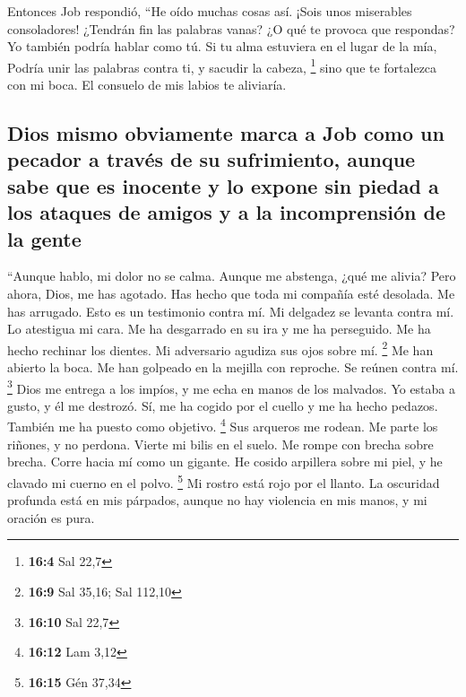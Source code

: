  Entonces Job respondió,  ``He oído muchas
cosas así. ¡Sois unos miserables consoladores!  ¿Tendrán
fin las palabras vanas? ¿O qué te provoca que respondas? 
Yo también podría hablar como tú. Si tu alma estuviera en el lugar de la
mía, Podría unir las palabras contra ti, y sacudir la cabeza,
\footnote{\textbf{16:4} Sal 22,7}  sino que te fortalezca
con mi boca. El consuelo de mis labios te aliviaría.

\hypertarget{dios-mismo-obviamente-marca-a-job-como-un-pecador-a-travuxe9s-de-su-sufrimiento-aunque-sabe-que-es-inocente-y-lo-expone-sin-piedad-a-los-ataques-de-amigos-y-a-la-incomprensiuxf3n-de-la-gente}{%
\subsection{Dios mismo obviamente marca a Job como un pecador a través
de su sufrimiento, aunque sabe que es inocente y lo expone sin piedad a
los ataques de amigos y a la incomprensión de la
gente}\label{dios-mismo-obviamente-marca-a-job-como-un-pecador-a-travuxe9s-de-su-sufrimiento-aunque-sabe-que-es-inocente-y-lo-expone-sin-piedad-a-los-ataques-de-amigos-y-a-la-incomprensiuxf3n-de-la-gente}}

 ``Aunque hablo, mi dolor no se calma. Aunque me abstenga,
¿qué me alivia?  Pero ahora, Dios, me has agotado. Has
hecho que toda mi compañía esté desolada.  Me has
arrugado. Esto es un testimonio contra mí. Mi delgadez se levanta contra
mí. Lo atestigua mi cara.  Me ha desgarrado en su ira y me
ha perseguido. Me ha hecho rechinar los dientes. Mi adversario agudiza
sus ojos sobre mí. \footnote{\textbf{16:9} Sal 35,16; Sal 112,10}
 Me han abierto la boca. Me han golpeado en la mejilla
con reproche. Se reúnen contra mí. \footnote{\textbf{16:10} Sal 22,7}
 Dios me entrega a los impíos, y me echa en manos de los
malvados.  Yo estaba a gusto, y él me destrozó. Sí, me ha
cogido por el cuello y me ha hecho pedazos. También me ha puesto como
objetivo. \footnote{\textbf{16:12} Lam 3,12}  Sus
arqueros me rodean. Me parte los riñones, y no perdona. Vierte mi bilis
en el suelo.  Me rompe con brecha sobre brecha. Corre
hacia mí como un gigante.  He cosido arpillera sobre mi
piel, y he clavado mi cuerno en el polvo. \footnote{\textbf{16:15} Gén
  37,34}  Mi rostro está rojo por el llanto. La oscuridad
profunda está en mis párpados,  aunque no hay violencia
en mis manos, y mi oración es pura.

